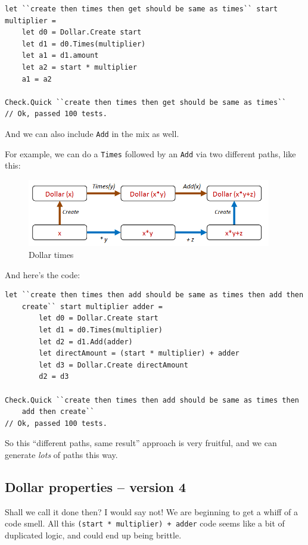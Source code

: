 \begin{verbatim}
let ``create then times then get should be same as times`` start multiplier = 
	let d0 = Dollar.Create start
	let d1 = d0.Times(multiplier)
	let a1 = d1.amount
	let a2 = start * multiplier     
	a1 = a2

Check.Quick ``create then times then get should be same as times``
// Ok, passed 100 tests.
\end{verbatim}
And we can also include \texttt{Add} in the mix as well.

For example, we can do a \texttt{Times} followed by an \texttt{Add} via
two different paths, like this:

\begin{figure}[htbp]
\centering
\includegraphics[width=0.95\textwidth]{pics/property_dollar_times3.png}
\caption{Dollar times}
\end{figure}

And here's the code:

\begin{verbatim}
let ``create then times then add should be same as times then add then 
    create`` start multiplier adder = 
        let d0 = Dollar.Create start
        let d1 = d0.Times(multiplier)
        let d2 = d1.Add(adder)
        let directAmount = (start * multiplier) + adder
        let d3 = Dollar.Create directAmount 
        d2 = d3

Check.Quick ``create then times then add should be same as times then 
    add then create`` 
// Ok, passed 100 tests.
\end{verbatim}
So this ``different paths, same result'' approach is very fruitful, and
we can generate \emph{lots} of paths this way.

\subsection{Dollar properties -- version
4}
\label{dollar-properties-version-4}

Shall we call it done then? I would say not! 
We are beginning to get a whiff of a code smell. All this
\texttt{(start\ *\ multiplier)\ +\ adder} code seems like a bit of
duplicated logic, and could end up being brittle.

